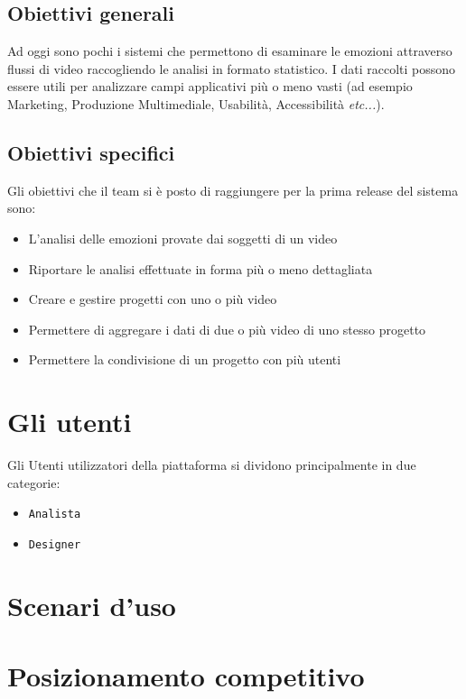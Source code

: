 \subsection{Obiettivi generali}\label{subsec:obiettivi-generali}

Ad oggi sono pochi i sistemi che permettono di esaminare le emozioni attraverso flussi
di video raccogliendo le analisi in formato statistico. I dati raccolti possono essere 
utili per analizzare campi applicativi più o meno vasti (ad esempio Marketing, Produzione
Multimediale, Usabilità, Accessibilità \textit{etc...}). 

\subsection{Obiettivi specifici}\label{subsec:obiettivi-specifici}

Gli obiettivi che il team si è posto di raggiungere per la prima release del sistema sono:

\begin{itemize}
	\item L'analisi delle emozioni provate dai soggetti di un video
	\item Riportare le analisi effettuate in forma più o meno dettagliata
	\item Creare e gestire progetti con uno o più video
	\item Permettere di aggregare i dati di due o più video di uno stesso progetto
	\item Permettere la condivisione di un progetto con più utenti
\end{itemize}

\section{Gli utenti}\label{sec:gli-utenti}

Gli Utenti utilizzatori della piattaforma si dividono principalmente in due categorie:

\begin{itemize}
	\item \texttt{Analista}
	\item \texttt{Designer}
\end{itemize}

\section{Scenari d'uso}\label{sec:scenari-duso}

\section{Posizionamento competitivo}\label{sec:posizionamento-competitivo}

